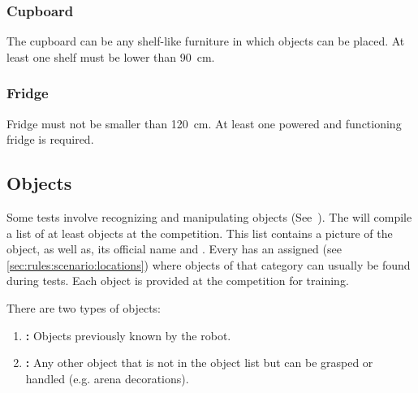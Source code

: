 \subsubsection{Cupboard}
The cupboard can be any shelf-like furniture in which objects can be placed. At least one shelf must be lower than \SI{90}{\cm}.

\subsubsection{Fridge}
Fridge must not be smaller than \SI{120}{\cm}. At least one powered and functioning fridge is required.

\subsection{Objects}
\label{sec:rules:scenario:objects}
Some tests involve recognizing and manipulating objects (See~).
The \TC{} will compile a list of at least \NumObjects{} objects at the competition. This list contains a picture of the object, as well as, its official name and \ObjectCategory{}. Every \ObjectCategory{} has an assigned \PredefinedLocation{} (see \ref{sec:rules:scenario:locations}) where objects of that category can usually be found during tests.
Each object is provided at the competition for training.

There are two types of objects:

\begin{enumerate}
	\item \textbf{\KnownObjects{}:} Objects previously known by the robot.%
	\item \textbf{\UnknownObjects{}:} Any other object that is not in the object list but can be grasped or handled (e.g. arena decorations).
\end{enumerate}

